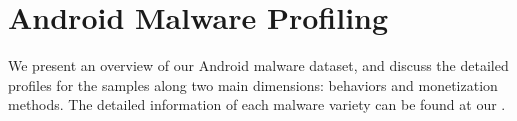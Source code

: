 \vspace{-.07in}
\section{Android Malware Profiling}
\label{sec:profile}

We present an overview of our Android malware dataset, and discuss 
the detailed profiles for the samples %
along two main dimensions: behaviors and monetization methods.
The detailed information of each malware variety can be found at our \amd.






